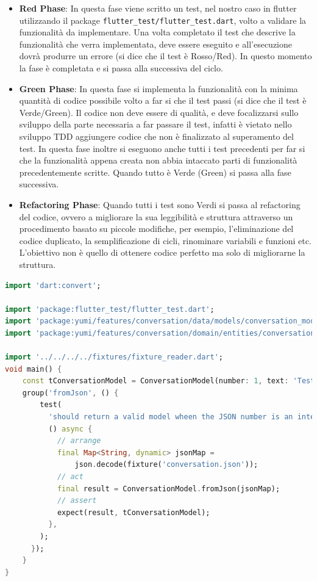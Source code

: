 \begin{itemize}
    \item \textbf{Red Phase}: In questa fase viene scritto un test, nel nostro caso in flutter utilizzando il package \texttt{flutter\_test/flutter\_test.dart}, volto a validare la funzionalità da implementare. Una volta completato il test che descrive la funzionalità che verra implementata, deve essere eseguito e all'esecuzione dovrà produrre un errore (si dice che il test è Rosso/Red). In questo momento la fase è completata e si passa alla successiva del ciclo.
    \item \textbf{Green Phase}: In questa fase si implementa la funzionalità con la minima quantità di codice possibile volto a far si che il test passi (si dice che il test è Verde/Green). Il codice non deve essere di qualità, e deve focalizzarsi sullo sviluppo della parte necessaria a far passare il test, infatti è vietato nello sviluppo TDD aggiungere codice che non è finalizzato al superamento del test. In questa fase inoltre si eseguono anche tutti i test precedenti per far si che la funzionalità appena creata non abbia intaccato parti di funzionalità precedentemente scritte. Quando tutto è Verde (Green) si passa alla fase successiva.
    \item \textbf{Refactoring Phase}: Quando tutti i test sono Verdi si passa al refactoring del codice, ovvero a migliorare la sua leggibilità e struttura attraverso un procedimento basato su piccole modifiche, per esempio, l'eliminazione del codice duplicato, la semplificazione di cicli, rinominare variabili e funzioni etc. L'obiettivo non è quello di ottenere codice perfetto ma solo di migliorarne la struttura.
\end{itemize}

\begin{lstlisting}[language=dart,caption=Un esempio di test all'interno del progetto per la creazione del modello]
import 'dart:convert';

import 'package:flutter_test/flutter_test.dart';
import 'package:yumi/features/conversation/data/models/conversation_model.dart';
import 'package:yumi/features/conversation/domain/entities/conversation.dart';

import '../../../../fixtures/fixture_reader.dart';
void main() {
    const tConversationModel = ConversationModel(number: 1, text: 'Test Text');
    group('fromJson', () {
        test(
          'should return a valid model wheen the JSON number is an integer',
          () async {
            // arrange
            final Map<String, dynamic> jsonMap =
                json.decode(fixture('conversation.json'));
            // act
            final result = ConversationModel.fromJson(jsonMap);
            // assert
            expect(result, tConversationModel);
          },
        );
      });
    }
}
\end{lstlisting}

